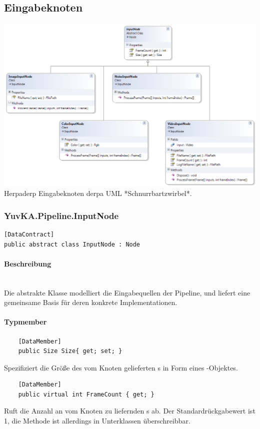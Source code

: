 \subsection{Eingabeknoten}

\includegraphics[width=\textwidth]{YuvKA.Pipeline/inputnodes.png}
Herpaderp Eingabeknoten derpa UML *Schnurrbartzwirbel*.

\subsubsection{YuvKA.Pipeline.InputNode}

\begin{verbatim}
[DataContract]
public abstract class InputNode : Node
\end{verbatim}

\paragraph{Beschreibung}~\\
Die abstrakte Klasse  modelliert die Eingabequellen der Pipeline, und liefert eine gemeinsame Basis für deren konkrete Implementationen.

\paragraph{Typmember}
\begin{itemize}

	\begin{verbatim}
	[DataMember]
	public Size Size{ get; set; }
	\end{verbatim}
	Spezifiziert die Größe des vom Knoten gelieferten s in Form eines -Objektes.

	\begin{verbatim}
	[DataMember]
	public virtual int FrameCount { get; }
	\end{verbatim}
	Ruft die Anzahl an vom Knoten zu liefernden s ab. Der Standardrückgabewert ist 1, die Methode ist allerdings in Unterklassen überschreibbar.

\end{itemize}

